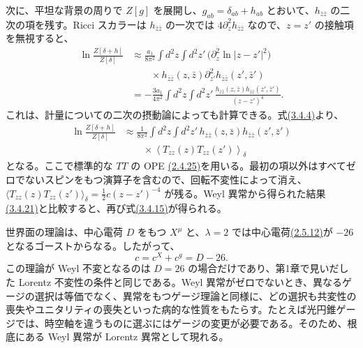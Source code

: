 次に、平坦な背景の周りで $Z[g]$ を展開し、$g_{ab}=\delta_{ab}+h_{ab}$ とおいて、$h_{\bar z\bar z}$ の二次の項を残す。Ricci スカラーは $h_{\bar z\bar z}$ の一次では $4\partial_z^2h_{\bar z\bar z}$ なので、$z=z'$ の接触項を無視すると、
\begin{equation}
\begin{aligned}
\ln\frac{Z[\delta+h]}{Z[\delta]}
&\approx\frac{a_1}{8\pi^2}
\int d^2z\int d^2z'\,
\bigl(\partial_z^2\ln|z-z'|^2\bigr)\\
&\qquad{}\times
h_{\bar z\bar z}(z,\bar z)\partial_{z'}^2h_{\bar z\bar z}(z',\bar z')\\
&=-\frac{3a_1}{4\pi^2}
\int d^2z\int d^2z'\,
\frac{h_{\bar z\bar z}(z,\bar z)h_{\bar z\bar z}(z',\bar z')}
{(z-z')^4}.
\end{aligned}
\tag{3.4.21}\label{eq:3.4.21}
\end{equation}
これは、計量についての二次の摂動論によっても計算できる。式\hyperref[eq:3.4.4]{(3.4.4)}より、
\begin{equation}
\begin{aligned}
\ln\frac{Z[\delta+h]}{Z[\delta]}
&\approx\frac1{8\pi^2}
\int d^2z\int d^2z'\,
h_{\bar z\bar z}(z,\bar z)h_{\bar z\bar z}(z',\bar z')\\
&\qquad{}\times
\left\langle T_{zz}(z)T_{zz}(z')\right\rangle_\delta
\end{aligned}
\tag{3.4.22}\label{eq:3.4.22}
\end{equation}
となる。ここで標準的な $TT$ の OPE \hyperref[eq:2.4.25]{(2.4.25)}を用いる。最初の項以外はすべてゼロでないスピンをもつ演算子を含むので、回転不変性によって消え、
$\langle T_{zz}(z)T_{zz}(z')\rangle_\delta=\tfrac12c(z-z')^{-4}$
が残る。Weyl 異常から得られた結果\hyperref[eq:3.4.21]{(3.4.21)}と比較すると、再び式\hyperref[eq:3.4.15]{(3.4.15)}が得られる。


世界面の理論は、中心電荷 $D$ をもつ $X^\mu$ と、$\lambda=2$ では中心電荷\hyperref[eq:2.5.12]{(2.5.12)}が $-26$ となるゴーストからなる。したがって、
\begin{equation}
c=c^X+c^g=D-26.
\tag{3.4.23}\label{eq:3.4.23}
\end{equation}
この理論が Weyl 不変となるのは $D=26$ の場合だけであり、第1章で見いだした Lorentz 不変性の条件と同じである。Weyl 異常がゼロでないとき、異なるゲージの選択は等価でなく、異常をもつゲージ理論と同様に、どの選択も共変性の喪失やユニタリティの喪失といった病的な性質をもたらす。たとえば光円錐ゲージでは、時空軸を違うものに選ぶにはゲージの変更が必要である。そのため、根底にある Weyl 異常が Lorentz 異常として現れる。

